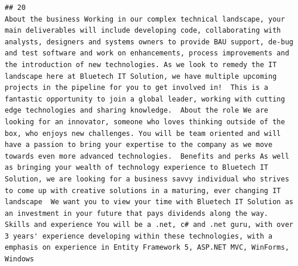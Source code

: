 \documentclass[11pt,a4paper,]{article}
\begin{document}
\begin{verbatim}
## 20                                                                                                                                                                                                                                                                                                                                                                                                                                                                                                                                                                                                                                                                                                                                                                                                                                                                                                                                                                                                                                                                                                                                                                                                                                                                                                                                                                                                                                                                                                                                                                                                                                                                                                                                                                                                                                                                                                                                                                    About the business Working in our complex technical landscape, your main deliverables will include developing code, collaborating with analysts, designers and systems owners to provide BAU support, de-bug and test software and work on enhancements, process improvements and the introduction of new technologies. As we look to remedy the IT landscape here at Bluetech IT Solution, we have multiple upcoming projects in the pipeline for you to get involved in!  This is a fantastic opportunity to join a global leader, working with cutting edge technologies and sharing knowledge.  About the role We are looking for an innovator, someone who loves thinking outside of the box, who enjoys new challenges. You will be team oriented and will have a passion to bring your expertise to the company as we move towards even more advanced technologies.  Benefits and perks As well as bringing your wealth of technology experience to Bluetech IT Solution, we are looking for a business savvy individual who strives to come up with creative solutions in a maturing, ever changing IT landscape  We want you to view your time with Bluetech IT Solution as an investment in your future that pays dividends along the way.   Skills and experience You will be a .net, c# and .net guru, with over 3 years' experience developing within these technologies, with a emphasis on experience in Entity Framework 5, ASP.NET MVC, WinForms, Windows 
\end{verbatim}
\end{document}

